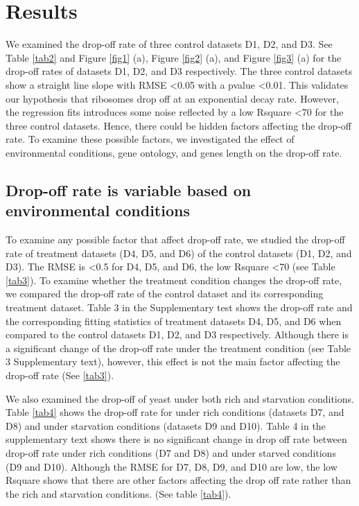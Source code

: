 \documentclass[a4,center,fleqn]{NAR}
\begin{document}
\section{Results}
We examined the drop-off rate of three control datasets D1, D2, and D3. See Table \ref{tab2} and Figure \ref{fig1} (a), Figure \ref{fig2} (a), and Figure \ref{fig3} (a) for the drop-off rates of datasets D1, D2, and D3 respectively. The three control datasets show a straight line slope  with RMSE \textless 0.05 with a pvalue \textless 0.01.  This validates our hypothesis that ribosomes drop off at an  exponential decay rate. However, the regression fits introduces some noise reflected by a low Rsquare \textless 70 for the three control datasets. Hence, there could be hidden factors affecting the drop-off rate. To examine these possible factors, we investigated the effect of environmental conditions, gene ontology, and genes length on the drop-off rate. 

\subsection{Drop-off rate is variable based on environmental conditions} 

To examine any possible factor that affect drop-off rate, we studied the drop-off rate of treatment datasets (D4, D5, and D6) of the control datasets (D1, D2, and D3).   The RMSE is \textless 0.5 for D4, D5, and D6, the low Rsquare \textless 70 (see Table \ref{tab3}).  
To examine  whether the treatment condition changes the drop-off rate, we compared the drop-off rate of the control dataset and its corresponding treatment dataset. Table 3 in the Supplementary test shows the drop-off rate and the corresponding fitting statistics of treatment datasets D4, D5, and D6 when compared to the control datasets D1, D2, and D3 respectively. 
Although there is a significant change of the drop-off rate under the treatment condition (see Table 3 Supplementary text),  however, this effect is not the main factor affecting the drop-off rate (See  \ref{tab3}). 

We also examined the drop-off of yeast under both rich and starvation conditions. Table \ref{tab4} shows the drop-off rate for under rich conditions (datasets D7, and D8) and under starvation conditions (datasets D9 and D10). Table 4 in the supplementary text shows  there is no significant change in drop off rate between drop-off rate under rich conditions (D7 and D8) and under starved conditions (D9 and D10). 
Although the RMSE for D7, D8, D9, and D10 are low, the low Rsquare shows that there are other factors affecting the drop off rate rather than the rich and starvation conditions. (See table \ref{tab4}). 
\end{document}
